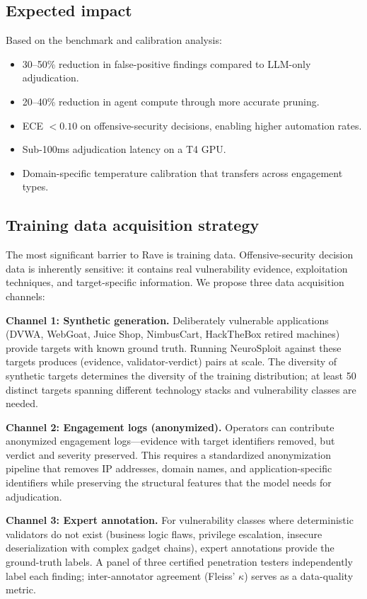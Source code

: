 \documentclass[conference]{IEEEtran}
\begin{document}
\subsection{Expected impact}

Based on the benchmark and calibration analysis:

\begin{itemize}[leftmargin=*]
\item 30--50\% reduction in false-positive findings compared to LLM-only adjudication.
\item 20--40\% reduction in agent compute through more accurate pruning.
\item ECE $< 0.10$ on offensive-security decisions, enabling higher automation rates.
\item Sub-100ms adjudication latency on a T4 GPU.
\item Domain-specific temperature calibration that transfers across engagement types.
\end{itemize}

\subsection{Training data acquisition strategy}

The most significant barrier to Rave is training data. Offensive-security decision data is inherently sensitive: it contains real vulnerability evidence, exploitation techniques, and target-specific information. We propose three data acquisition channels:

\textbf{Channel 1: Synthetic generation.} Deliberately vulnerable applications (DVWA, WebGoat, Juice Shop, NimbusCart, HackTheBox retired machines) provide targets with known ground truth. Running NeuroSploit against these targets produces (evidence, validator-verdict) pairs at scale. The diversity of synthetic targets determines the diversity of the training distribution; at least 50 distinct targets spanning different technology stacks and vulnerability classes are needed.

\textbf{Channel 2: Engagement logs (anonymized).} Operators can contribute anonymized engagement logs---evidence with target identifiers removed, but verdict and severity preserved. This requires a standardized anonymization pipeline that removes IP addresses, domain names, and application-specific identifiers while preserving the structural features that the model needs for adjudication.

\textbf{Channel 3: Expert annotation.} For vulnerability classes where deterministic validators do not exist (business logic flaws, privilege escalation, insecure deserialization with complex gadget chains), expert annotations provide the ground-truth labels. A panel of three certified penetration testers independently label each finding; inter-annotator agreement (Fleiss' $\kappa$) serves as a data-quality metric.
\end{document}
